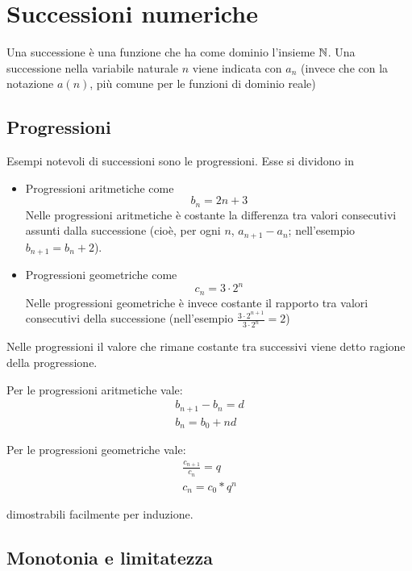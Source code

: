 \section{Successioni numeriche}
\begin{defin}
	Una successione è una funzione che ha come dominio l'insieme $\mathbb{N}$. Una successione nella variabile naturale $n$ viene indicata con $a_n$ (invece che con la notazione $a(n)$, più comune per le funzioni di dominio reale)
\end{defin}


\subsection{Progressioni}
\label{succ:progr}
Esempi notevoli di successioni sono le progressioni. Esse si dividono in
\begin{itemize}
	\item Progressioni aritmetiche come
	      \[
		      b_n=2n+3
	      \]
	      Nelle progressioni aritmetiche è costante la differenza tra valori consecutivi assunti dalla successione (cioè, per ogni $n$, $a_{n+1}-a_n$; nell'esempio $b_{n+1}=b_n+2$).
	\item Progressioni geometriche come
	      \[
		      c_n=3\cdot 2^n
	      \]
	      Nelle progressioni geometriche è invece costante il rapporto tra valori consecutivi della successione (nell'esempio $\frac{3\cdot2^{n+1}}{3\cdot2^n}=2$)
\end{itemize}
Nelle progressioni il valore che rimane costante tra successivi viene detto ragione della progressione.

\begin{prop}
	Per le progressioni aritmetiche vale:
	\begin{gather}
		b_{n+1}-b_n=d \\
		b_n=b_0+nd
	\end{gather}
\end{prop}
\begin{prop}
	Per le progressioni geometriche vale:
	\begin{gather}
		\frac{c_{n+1}}{c_n}=q \\
		c_n=c_0*q^n
	\end{gather}

\end{prop}
dimostrabili facilmente per induzione.


\subsection{Monotonia e limitatezza}

